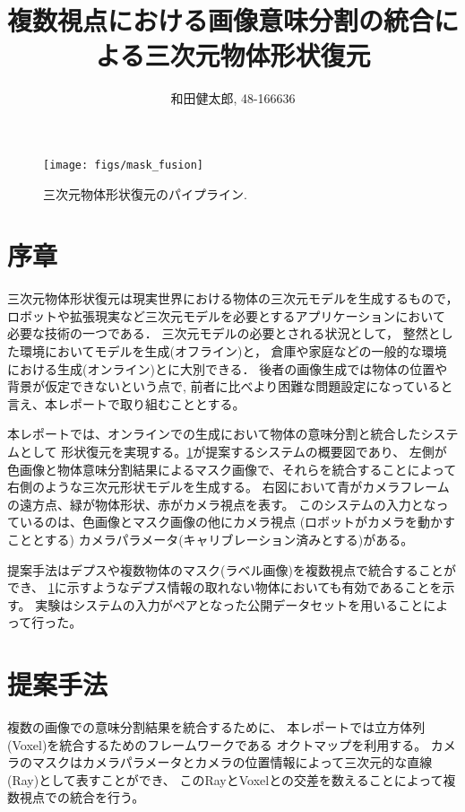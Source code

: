 \documentclass{jarticle}
\begin{document}
\title{複数視点における画像意味分割の統合による三次元物体形状復元}
\author{和田健太郎, 48-166636}

\maketitle

\begin{figure}[t]
  \centering
  \texttt{[image: figs/mask\_fusion]}
  \caption{三次元物体形状復元のパイプライン.}
  \label{fig:system}
\end{figure}

\section{序章}

三次元物体形状復元は現実世界における物体の三次元モデルを生成するもので，
ロボットや拡張現実など三次元モデルを必要とするアプリケーションにおいて
必要な技術の一つである．
三次元モデルの必要とされる状況として，
整然とした環境においてモデルを生成(オフライン)と，
倉庫や家庭などの一般的な環境における生成(オンライン)とに大別できる．
後者の画像生成では物体の位置や背景が仮定できないという点で,
前者に比べより困難な問題設定になっていると言え、本レポートで取り組むこととする。

本レポートでは、オンラインでの生成において物体の意味分割と統合したシステムとして
形状復元を実現する。\ref{fig:system}が提案するシステムの概要図であり、
左側が色画像と物体意味分割結果によるマスク画像で、それらを統合することによって
右側のような三次元形状モデルを生成する。
右図において青がカメラフレームの遠方点、緑が物体形状、赤がカメラ視点を表す。
このシステムの入力となっているのは、色画像とマスク画像の他にカメラ視点
(ロボットがカメラを動かすこととする)
カメラパラメータ(キャリブレーション済みとする)がある。

提案手法はデプスや複数物体のマスク(ラベル画像)を複数視点で統合することができ、
\ref{fig:system}に示すようなデプス情報の取れない物体においても有効であることを示す。
実験はシステムの入力がペアとなった公開データセット\cite{zeng2016multi}を用いることによって行った。

\section{提案手法}

複数の画像での意味分割結果を統合するために、
本レポートでは立方体列(Voxel)を統合するためのフレームワークである
オクトマップ\cite{hornung2013octomap}を利用する。
カメラのマスクはカメラパラメータとカメラの位置情報によって三次元的な直線(Ray)として表すことができ、
このRayとVoxelとの交差を数えることによって複数視点での統合を行う。

{\footnotesize


}
\end{document}
